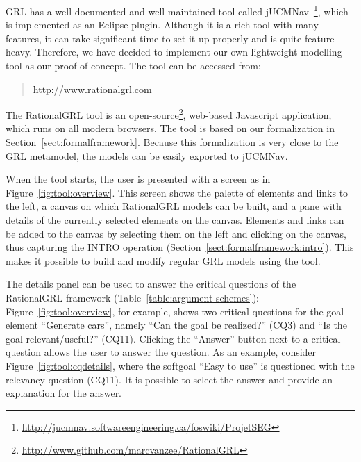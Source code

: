 GRL has a well-documented and well-maintained tool called jUCMNav~\cite{jUCMNav}\footnote{\url{http://jucmnav.softwareengineering.ca/foswiki/ProjetSEG}}, which is implemented as an Eclipse plugin. Although it is a rich tool with many features, it can take significant time to set it up properly and is quite feature-heavy. Therefore, we have decided to implement our own lightweight modelling tool as our proof-of-concept. The tool can be accessed from:

\begin{quote}
\url{http://www.rationalgrl.com}
\end{quote}

The RationalGRL tool is an open-source\footnote{\url{http://www.github.com/marcvanzee/RationalGRL}}, web-based Javascript application, which runs on all modern browsers. The tool is based on our formalization in Section~\ref{sect:formalframework}. Because this formalization is very close to the GRL metamodel, the models can be easily exported to jUCMNav.

When the tool starts, the user is presented with a screen as in Figure~\ref{fig:tool:overview}. This screen shows the palette of elements and links to the left, a canvas on which RationalGRL models can be built, and a pane with details of the currently selected elements on the canvas. Elements and links can be added to the canvas by selecting them on the left and clicking on the canvas, thus capturing the \textsf{INTRO} operation (Section~\ref{sect:formalframework:intro}). This makes it possible to build and modify regular GRL models using the tool. 

The details panel can be used to answer the critical questions of the RationalGRL framework (Table~\ref{table:argument-schemes}): Figure~\ref{fig:tool:overview}, for example, shows two critical questions for the goal element ``Generate cars'', namely ``Can the goal be realized?'' (CQ3) and ``Is the goal relevant/useful?'' (CQ11). Clicking the ``Answer'' button next to a critical question allows the user to answer the question. As an example, consider Figure~\ref{fig:tool:cqdetails}, where the softgoal ``Easy to use'' is questioned with the relevancy question (CQ11). It is possible to select the answer and provide an explanation for the answer. 

